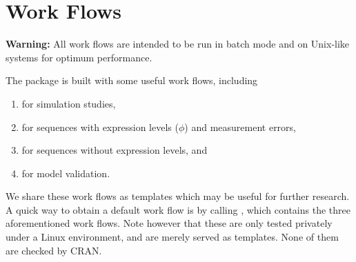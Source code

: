 
\section[Work Flows]{Work Flows}
\label{sec:work_flows}

{\color{red} \bf Warning:}
All work flows are intended to be run in batch mode and on Unix-like systems 
for optimum performance.

The  package is built with some useful work flows,
including
\begin{enumerate}
\item {} for simulation studies,
\item {} for sequences with expression levels ($\phi$) and
                  measurement errors,
\item {} for sequences without expression levels, and
\item {} for model validation.
\end{enumerate}
We share these work flows as templates which may be useful for further
research. A quick way to obtain a default work flow is by calling
, which contains the three aforementioned 
work flows. Note however that these are only tested privately under a 
Linux environment, and are merely served as templates. None of them are 
checked by CRAN.

